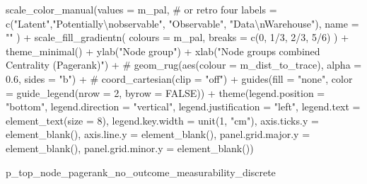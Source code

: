 \documentclass[
  letterpaper,
  DIV=11,
  numbers=noendperiod]{scrartcl}
\newenvironment{Shaded}{\begin{snugshade}}{\end{snugshade}}
\newcommand{\AttributeTok}[1]{\textcolor[rgb]{0.40,0.45,0.13}{#1}}
\newcommand{\CommentTok}[1]{\textcolor[rgb]{0.37,0.37,0.37}{#1}}
\newcommand{\ConstantTok}[1]{\textcolor[rgb]{0.56,0.35,0.01}{#1}}
\newcommand{\DecValTok}[1]{\textcolor[rgb]{0.68,0.00,0.00}{#1}}
\newcommand{\FunctionTok}[1]{\textcolor[rgb]{0.28,0.35,0.67}{#1}}
\newcommand{\NormalTok}[1]{\textcolor[rgb]{0.00,0.23,0.31}{#1}}
\newcommand{\SpecialCharTok}[1]{\textcolor[rgb]{0.37,0.37,0.37}{#1}}
\newcommand{\StringTok}[1]{\textcolor[rgb]{0.13,0.47,0.30}{#1}}
\begin{document}
\begin{Shaded}
\begin{Highlighting}[]
    \FunctionTok{scale\_color\_manual}\NormalTok{(}\AttributeTok{values =}\NormalTok{ m\_pal, }\CommentTok{\# or retro four}
                       \AttributeTok{labels =} \FunctionTok{c}\NormalTok{(}\StringTok{"Latent"}\NormalTok{,}\StringTok{"Potentially}\SpecialCharTok{\textbackslash{}n}\StringTok{observable"}\NormalTok{, }\StringTok{"Observable"}\NormalTok{, }\StringTok{"Data}\SpecialCharTok{\textbackslash{}n}\StringTok{Warehouse"}\NormalTok{),}
                       \AttributeTok{name =} \StringTok{""}
\NormalTok{    ) }\SpecialCharTok{+}
    \FunctionTok{scale\_fill\_gradientn}\NormalTok{(}
        \AttributeTok{colours =}\NormalTok{ m\_pal,}
        \AttributeTok{breaks =} \FunctionTok{c}\NormalTok{(}\DecValTok{0}\NormalTok{, }\DecValTok{1}\SpecialCharTok{/}\DecValTok{3}\NormalTok{, }\DecValTok{2}\SpecialCharTok{/}\DecValTok{3}\NormalTok{, }\DecValTok{5}\SpecialCharTok{/}\DecValTok{6}\NormalTok{)}
\NormalTok{        ) }\SpecialCharTok{+}
        \FunctionTok{theme\_minimal}\NormalTok{() }\SpecialCharTok{+}
            \FunctionTok{ylab}\NormalTok{(}\StringTok{"Node group"}\NormalTok{) }\SpecialCharTok{+}
            \FunctionTok{xlab}\NormalTok{(}\StringTok{"Node groups combined Centrality (Pagerank)"}\NormalTok{) }\SpecialCharTok{+}
            \CommentTok{\# geom\_rug(aes(colour = m\_dist\_to\_trace), alpha = 0.6, sides = "b") +}
            \CommentTok{\# coord\_cartesian(clip = "off") +}
            \FunctionTok{guides}\NormalTok{(}\AttributeTok{fill =} \StringTok{"none"}\NormalTok{,}
                   \AttributeTok{color =} \FunctionTok{guide\_legend}\NormalTok{(}\AttributeTok{nrow =} \DecValTok{2}\NormalTok{, }\AttributeTok{byrow =} \ConstantTok{FALSE}\NormalTok{)) }\SpecialCharTok{+}
            \FunctionTok{theme}\NormalTok{(}\AttributeTok{legend.position =} \StringTok{"bottom"}\NormalTok{,}
          \AttributeTok{legend.direction =} \StringTok{"vertical"}\NormalTok{,}
                  \AttributeTok{legend.justification =} \StringTok{"left"}\NormalTok{,}
                  \AttributeTok{legend.text  =} \FunctionTok{element\_text}\NormalTok{(}\AttributeTok{size =} \DecValTok{8}\NormalTok{),}
                  \AttributeTok{legend.key.width =} \FunctionTok{unit}\NormalTok{(}\DecValTok{1}\NormalTok{, }\StringTok{"cm"}\NormalTok{),}
                  \AttributeTok{axis.ticks.y =} \FunctionTok{element\_blank}\NormalTok{(),}
                  \AttributeTok{axis.line.y =} \FunctionTok{element\_blank}\NormalTok{(),}
                  \AttributeTok{panel.grid.major.y =} \FunctionTok{element\_blank}\NormalTok{(),}
          \AttributeTok{panel.grid.minor.y =} \FunctionTok{element\_blank}\NormalTok{())}
    
\NormalTok{p\_top\_node\_pagerank\_no\_outcome\_measurability\_discrete}
\end{Highlighting}
\end{Shaded}
\end{document}
